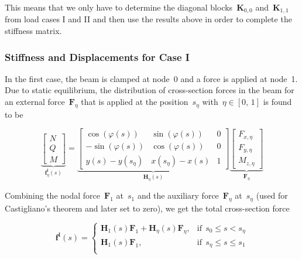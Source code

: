 This means that we only have to determine the diagonal blocks~$\boldsymbol{K}_{0,0}$ and~$\boldsymbol{K}_{1,1}$ from load cases I and II and then use the results above in order to complete the stiffness matrix.

\subsubsection*{Stiffness and Displacements for Case I}

In the first case, the beam is clamped at node~0 and a force is applied at node~1.
Due to static equilibrium, the distribution of cross-section forces in the beam for an external force~$\boldsymbol{F}_\eta$ that is applied at the position~$s_\eta$ with~$\eta \in [0,\,1]$ is found to be

\begin{equation}
\underbrace{
\begin{bmatrix}
N \\ Q \\ M
\end{bmatrix}
}_{\boldsymbol{f}^{\mathrm{I}}_{\eta}(s)}
=
\underbrace{
\begin{bmatrix}
\cos(\varphi(s)) & \sin(\varphi(s)) & 0 \\
-\sin(\varphi(s)) & \cos(\varphi(s)) & 0 \\
y(s) - y(s_\eta) & x(s_\eta) - x(s) & 1
\end{bmatrix}
}_{\boldsymbol{H}_{\eta}(s)}
\underbrace{
\begin{bmatrix}
F_{x,\eta} \\ F_{y,\eta} \\ M_{z,\eta}
\end{bmatrix}
}_{\boldsymbol{F}_\eta} \label{eq:section-static-equilibrium-1}
\end{equation}

Combining the nodal force~$\boldsymbol{F}_1$ at~$s_1$ and the auxiliary force~$\boldsymbol{F}_\eta$ at~$s_\eta$ (used for Castigliano's theorem and later set to zero), we get the total cross-section force

\begin{equation}
\boldsymbol{f}^{\mathrm{I}}(s) = \begin{cases}
\boldsymbol{H}_{1}(s)\boldsymbol{F}_1 + \boldsymbol{H}_{\eta}(s)\boldsymbol{F}_\eta, & \text{if}\ \ s_0 \le s < s_\eta \\
\boldsymbol{H}_{1}(s)\boldsymbol{F}_1, & \text{if}\ \ s_\eta \le s \le s_1 \\
\end{cases}
\end{equation}

